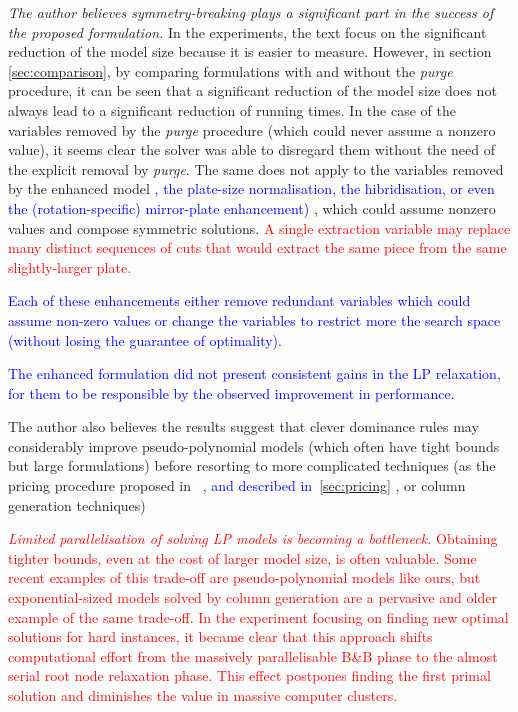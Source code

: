 \documentclass[ppgc,tese,english,formais,babel]{iiufrgs}
\newif\iffinalversion
\newcommand{\newtext}[1]{\iffinalversion%
#1%
\else%
\textcolor{blue}{#1}%
\fi%
}
\newcommand{\oldtext}[1]{\iffinalversion%
\else%
\textcolor{red}{#1}%
\fi%
}
\begin{document}
\emph{The author believes symmetry-breaking plays a significant part in the success of the proposed formulation.}
In the experiments, the text focus on the significant reduction of the model size because it is easier to measure.
However, in section \cref{sec:comparison}, by comparing formulations with and without the \emph{purge} procedure, it can be seen that a significant reduction of the model size does not always lead to a significant reduction of running times.
In the case of the variables removed by the \emph{purge} procedure (which could never assume a nonzero value), it seems clear the solver was able to disregard them without the need of the explicit removal by \emph{purge}.
The same does not apply to the variables removed by the enhanced model \newtext{, the plate-size normalisation, the hibridisation, or even the (rotation-specific) mirror-plate enhancement)}, which could assume nonzero values and compose symmetric solutions.
\oldtext{A single extraction variable may replace many distinct sequences of cuts that would extract the same piece from the same slightly-larger plate.}
\newtext{Each of these enhancements either remove redundant variables which could assume non-zero values or change the variables to restrict more the search space (without losing the guarantee of optimality).}
\newtext{The enhanced formulation did not present consistent gains in the LP relaxation, for them to be responsible by the observed improvement in performance.}
The author also believes the results suggest that clever dominance rules may considerably improve pseudo-polynomial models (which often have tight bounds but large formulations) before resorting to more complicated techniques (as the pricing procedure proposed in~\citet{furini:2016}\newtext{, and described in~\cref{sec:pricing}}, or column generation techniques)

\oldtext{
\emph{Limited parallelisation of solving LP models is becoming a bottleneck.}
Obtaining tighter bounds, even at the cost of larger model size, is often valuable.
Some recent examples of this trade-off are pseudo-polynomial models like ours, but exponential-sized models solved by column generation are a pervasive and older example of the same trade-off.
In the experiment focusing on finding new optimal solutions for hard instances, it became clear that this approach shifts computational effort from the massively parallelisable B\&B phase to the almost serial root node relaxation phase.
This effect postpones finding the first primal solution and diminishes the value in massive computer clusters.
}
\end{document}
